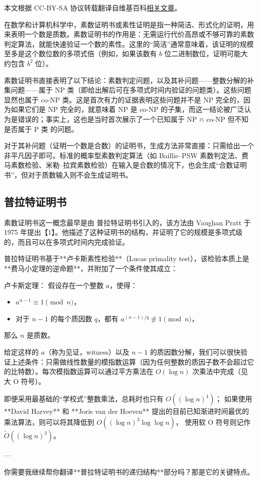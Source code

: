
本文根据 CC-BY-SA 协议转载翻译自维基百科\href{https://en.wikipedia.org/wiki/Primality_certificate}{相关文章}。

在数学和计算机科学中，素数证明书或素性证明是指一种简洁、形式化的证明，用来表明一个数是质数。素数证明书的作用是：无需运行代价高昂或不够可靠的素数判定算法，就能快速验证一个数的素性。这里的“简洁”通常意味着，该证明的规模至多是这个数位数的多项式倍（例如，如果该数有 $b$ 位二进制数位，证明可能大约包含 $b^2$ 位）。

素数证明书直接表明了以下结论：素数判定问题，以及其补问题——整数分解的补集问题——属于 NP 类（即给出解后可在多项式时间内验证的问题类）。这些问题显然也属于 co-NP 类。这是首次有力的证据表明这些问题并不是 NP 完全的，因为如果它们是 NP 完全的，就意味着 NP 是 co-NP 的子集，而这一结论被广泛认为是错误的；事实上，这也是当时首次展示了一个已知属于 NP ∩ co-NP 但不知是否属于 P 类 的问题。

对于其补问题（证明一个数是合数）的证明书，生成方法非常直接：只需给出一个非平凡因子即可。标准的概率型素数判定算法（如 Baillie–PSW 素数判定法、费马素数检验、米勒–拉宾素数检验）在输入是合数的情况下，也会生成“合数证明书”，但对于质数输入则不会生成证明书。
\subsection{普拉特证明书}
素数证明书这一概念最早是由 普拉特证明书引入的，该方法由 Vaughan Pratt 于 1975 年提出【1】。他描述了这种证明书的结构，并证明了它的规模是多项式级的，而且可以在多项式时间内完成验证。

普拉特证明书基于**卢卡斯素性检验**（Lucas primality test），该检验本质上是**费马小定理的逆命题**，并附加了一个条件使其成立：

卢卡斯定理：
假设存在一个整数 $a$，使得：
\begin{itemize}
\item $a^{n - 1} \equiv 1 \pmod{n}$，
\item 对于 $n - 1$ 的每个质因数 $q$，都有 $a^{(n - 1) / q} \not\equiv 1 \pmod{n}$，
\end{itemize}
那么 $n$ 是质数。

给定这样的 $a$（称为见证，witness）以及 $n - 1$ 的质因数分解，我们可以很快验证上述条件：只需做线性数量的模指数运算（因为任何整数的质因子数不会超过它的比特数）。每次模指数运算可以通过平方乘法在 $O(\log n)$ 次乘法中完成（见大 O 符号）。

即便采用最基础的“学校式”整数乘法，总耗时也只有 $O((\log n)^{4})$；
如果使用 **David Harvey** 和 **Joris van der Hoeven** 提出的目前已知渐进时间最优的乘法算法，则可以将其降低到 $O((\log n)^{3} \log\log n)$，
使用软 O 符号则记作 $\tilde{O}((\log n)^{3})$。

---

你需要我继续帮你翻译**普拉特证明书的递归结构**部分吗？那是它的关键特点。
